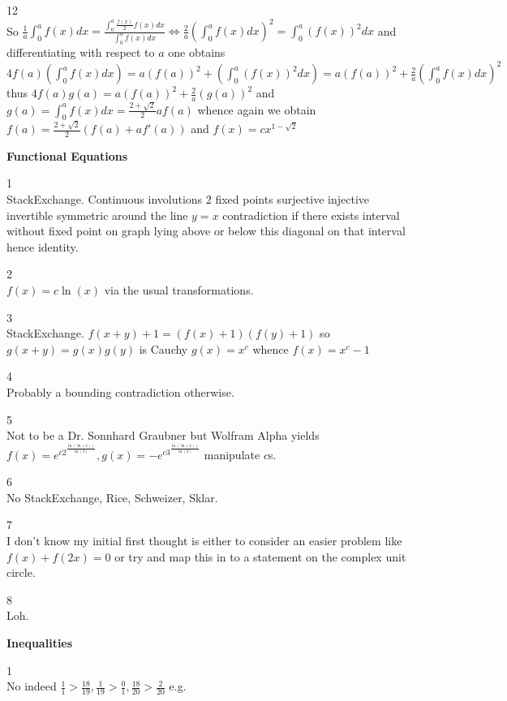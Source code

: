 12 \\
So $\frac{1}{a}\int_0^a f(x)dx=\frac{\int_0^a \frac{f(x)}{2}f(x)dx}{\int_0^a f(x)dx} \iff \frac{2}{a}\left(\int_0^a f(x)dx \right)^2=\int_0^a (f(x))^2 dx$ and differentiating with respect to $a$ one obtains $4f(a)\left(\int_0^a f(x)dx\right)=a(f(a))^2+\left(\int_0^a (f(x))^2 dx \right)=a(f(a))^2+\frac{2}{a}\left(\int_0^a f(x)dx \right)^2$ thus $4f(a)g(a)=a(f(a))^2+\frac{2}{a}(g(a))^2$ and $g(a)=\int_0^a f(x)dx=\frac{2+\sqrt{2}}{2}af(a)$ whence again we obtain $f(a)=\frac{2+\sqrt{2}}{2}(f(a)+af'(a))$ and $\boxed{f(x)=cx^{1-\sqrt{2}}}$

\newpage

\textbf{Functional Equations}

1 \\
StackExchange. Continuous involutions $2$ fixed points surjective injective invertible symmetric around the line $y=x$ contradiction if there exists interval without fixed point on graph lying above or below this diagonal on that interval hence identity.

2 \\
$\boxed{f(x)=c\ln(x)}$ via the usual transformations.

3 \\
StackExchange. $f(x+y)+1=(f(x)+1)(f(y)+1)$ so $g(x+y)=g(x)g(y)$ is Cauchy $g(x)=x^c$ whence $\boxed{f(x)=x^c-1}$

4 \\
Probably a bounding contradiction otherwise.

5 \\
Not to be a Dr. Sonnhard Graubner but Wolfram Alpha yields $\boxed{f(x)=e^{c2^{\frac{\ln(\ln(x))}{\ln(3)}}},g(x)=-e^{c3^{\frac{\ln(\ln(x))}{\ln(2)}}}}$ manipulate $c$s.

6 \\
$\boxed{\text{No}}$ StackExchange, Rice, Schweizer, Sklar.

7 \\
I don't know my initial first thought is either to consider an easier problem like $f(x)+f(2x)=0$ or try and map this in to a statement on the complex unit circle.

8 \\
Loh.

\newpage

\textbf{Inequalities}

1 \\
$\boxed{\text{No}}$ indeed $\frac{1}{1}>\frac{18}{19},\frac{1}{19}>\frac{0}{1},\frac{18}{20}>\frac{2}{20}$ e.g.

